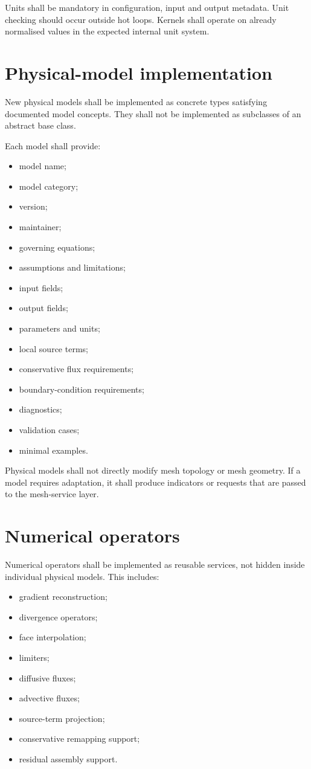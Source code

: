 \documentclass[11pt,a4paper]{article}
\begin{document}
Units shall be mandatory in configuration, input and output metadata. Unit checking should occur outside hot loops. Kernels shall operate on already normalised values in the expected internal unit system.

\section{Physical-model implementation}

New physical models shall be implemented as concrete types satisfying documented model concepts. They shall not be implemented as subclasses of an abstract base class.

Each model shall provide:

\begin{itemize}
  \item model name;
  \item model category;
  \item version;
  \item maintainer;
  \item governing equations;
  \item assumptions and limitations;
  \item input fields;
  \item output fields;
  \item parameters and units;
  \item local source terms;
  \item conservative flux requirements;
  \item boundary-condition requirements;
  \item diagnostics;
  \item validation cases;
  \item minimal examples.
\end{itemize}

Physical models shall not directly modify mesh topology or mesh geometry. If a model requires adaptation, it shall produce indicators or requests that are passed to the mesh-service layer.

\section{Numerical operators}

Numerical operators shall be implemented as reusable services, not hidden inside individual physical models. This includes:

\begin{itemize}
  \item gradient reconstruction;
  \item divergence operators;
  \item face interpolation;
  \item limiters;
  \item diffusive fluxes;
  \item advective fluxes;
  \item source-term projection;
  \item conservative remapping support;
  \item residual assembly support.
\end{itemize}
\end{document}
